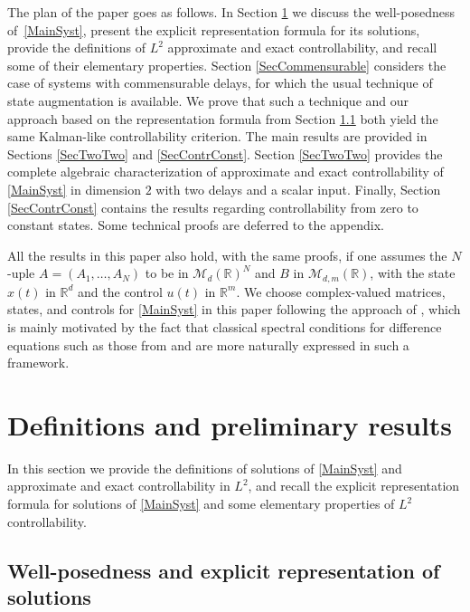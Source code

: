 \documentclass[10pt]{article}
\newcommand{\Subsection}{\subsection}
\theoremstyle{plain}
\theoremstyle{definition}
\numberwithin{equation}{section}\numberwithin{figure}{section}\emergencystretch=3em
\begin{document}
The plan of the paper goes as follows. In Section \ref{SecPrevResults} we discuss the well-posedness of~\eqref{MainSyst}, present the explicit representation formula for its solutions, provide the definitions of $L^2$ approximate and exact controllability, and recall some of their elementary properties. Section \ref{SecCommensurable} considers the case of systems with commensurable delays, for which the usual technique of state augmentation is available. We prove that such a technique and our approach based on the representation formula from Section \ref{SecControlDelayWellPosed} both yield the same Kalman-like controllability criterion. The main results are provided in Sections \ref{SecTwoTwo} and \ref{SecContrConst}. Section \ref{SecTwoTwo} provides the complete algebraic characterization of approximate and exact controllability of \eqref{MainSyst} in dimension $2$ with two delays and a scalar input. Finally, Section \ref{SecContrConst} contains the results regarding controllability from zero to constant states. Some technical proofs are deferred to the appendix.

All the results in this paper also hold, with the same proofs, if one assumes the $N$\nobreakdash-uple $A = (A_1, \dots, A_N)$ to be in $\mathcal M_d(\mathbb R)^N$
and $B$ in $\mathcal M_{d, m}(\mathbb R)$, with the state $x(t)$ in $\mathbb R^d$ and the control $u(t)$ in $\mathbb R^m$. We choose complex-valued matrices, states, and controls for \eqref{MainSyst} in this paper following the approach of \cite{Chitour2016Stability}, which is mainly motivated by the fact that classical spectral conditions for difference equations such as those from \cite{Avellar1980Zeros, Henry1974Linear, Hale2002Strong} and \cite[Chap.\,9]{Hale1993Introduction} are more naturally expressed in such a framework.

\section{Definitions and preliminary results}
\label{SecPrevResults}

In this section we provide the definitions of solutions of \eqref{MainSyst} and approximate and exact controllability in $L^2$, and recall the explicit representation formula for solutions of \eqref{MainSyst} and some elementary properties of $L^2$ controllability.

\Subsection{Well-posedness and explicit representation of solutions}
\label{SecControlDelayWellPosed}
\end{document}
